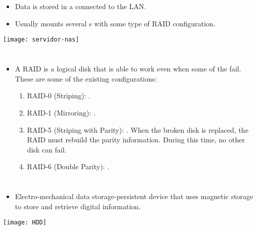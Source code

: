 \section{}
\begin{itemize}
\item Data is stored in a 
  connected to the \gls{LAN}.
\item Usually mounts several s with some type of
  \gls{RAID} configuration.
\end{itemize}
\vspace{-4ex}
\begin{center}
  \texttt{[image: servidor-nas]}
\end{center}

\section{}
\begin{itemize}
\item A \gls{RAID} is a logical disk that is able to work even when
  some of the 
  fail. These are some of the existing configurations:
  \begin{enumerate}
  \item RAID-0 (Striping): .
  \item RAID-1 (Mirroring): .
  \item RAID-5 (Striping with Parity): . When the broken disk is replaced, the RAID must
    rebuild the parity information. During this time, no other disk
    can fail.
  \item RAID-6 (Double Parity): .
  \end{enumerate}
\end{itemize}

\section{}
\begin{itemize}
\item Electro-mechanical data storage-persistent device that uses
  magnetic storage to store and retrieve digital information.
\end{itemize}
\vspace{-4ex}
\begin{center}
  \texttt{[image: HDD]}
\end{center}

